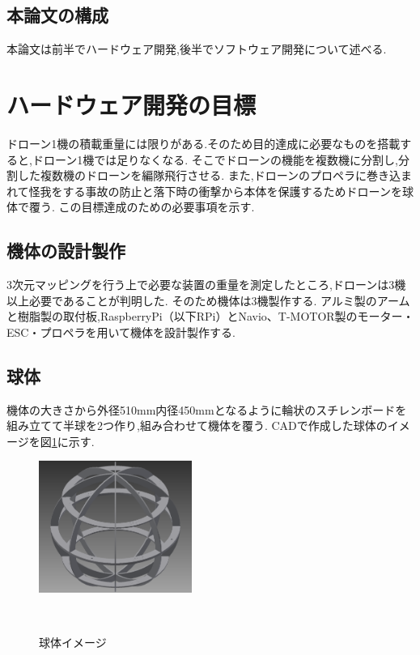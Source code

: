 \documentclass[a4paper]{jarticle}
\begin{document}
\subsection{本論文の構成}
本論文は前半でハードウェア開発,後半でソフトウェア開発について述べる.


\section{ハードウェア開発の目標}
ドローン1機の積載重量には限りがある.そのため目的達成に必要なものを搭載すると,ドローン1機では足りなくなる.
そこでドローンの機能を複数機に分割し,分割した複数機のドローンを編隊飛行させる.
また,ドローンのプロペラに巻き込まれて怪我をする事故の防止と落下時の衝撃から本体を保護するためドローンを球体で覆う.
この目標達成のための必要事項を示す.

\subsection{機体の設計製作}
3次元マッピングを行う上で必要な装置の重量を測定したところ,ドローンは3機以上必要であることが判明した.
そのため機体は3機製作する.
アルミ製のアームと樹脂製の取付板,RaspberryPi（以下RPi）とNavio、T-MOTOR製のモーター・ESC・プロペラを用いて機体を設計製作する.

\subsection{球体}
機体の大きさから外径510mm内径450mmとなるように輪状のスチレンボードを組み立てて半球を2つ作り,組み合わせて機体を覆う.
CADで作成した球体のイメージを図\ref{fig:sphere-CAD}に示す.

\begin{figure}[htbp]
 \begin{center}
  \includegraphics[width=50mm]{image/sphere-CAD.png}
 　\caption{球体イメージ}
 　\label{fig:sphere-CAD}
 \end{center}
\end{figure}
\end{document}
